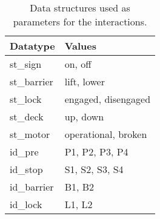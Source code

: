 \begin{table}[htb]%
\begin{tabular}{ll}
	\textbf{Datatype} & \textbf{Values}\\
	\hline
	st\_sign & on, off\\
	st\_barrier & lift, lower\\
	st\_lock & engaged, disengaged\\
	st\_deck & up, down\\
	st\_motor & operational, broken\\
	id\_pre & P1, P2, P3, P4\\
	id\_stop & S1, S2, S3, S4\\
	id\_barrier & B1, B2\\
	id\_lock & L1, L2\\
\end{tabular}
\caption{Data structures used as parameters for the interactions.}
\label{tab:types}
\end{table}
%

\newpage